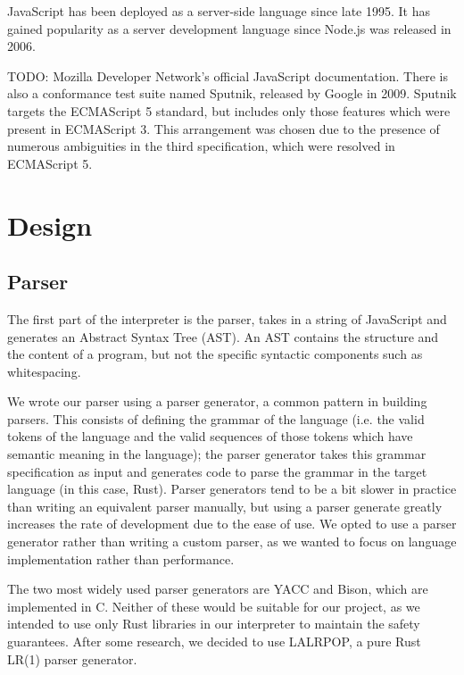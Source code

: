 \documentclass{article}
\begin{document}
\begin{multicols}{2}
JavaScript has been deployed as a server-side language since late 1995. It has
gained popularity as a server development language since Node.js was released in
2006.\newline

TODO: Mozilla Developer Network's official JavaScript documentation\cite{mozdocs}.
There is also a conformance test suite named Sputnik, released by Google in
2009. Sputnik targets the ECMAScript 5 standard, but includes only those
features which were present in ECMAScript 3. This arrangement was chosen due to
the presence of numerous ambiguities in the third specification, which were
resolved in ECMAScript 5.

\section{Design}

\subsection{Parser}

The first part of the interpreter is the parser,
takes in a string of JavaScript and generates an Abstract Syntax Tree (AST).
An AST contains the structure and the content of a program, but not the specific
syntactic components such as whitespacing. \newline

We wrote our parser using a parser generator, a common pattern in building
parsers. This consists of defining the grammar of the language (i.e. the valid
tokens of the language and the valid sequences of those tokens which have
semantic meaning in the language); the parser generator takes this grammar
specification as input and generates code to parse the grammar in the target
language (in this case, Rust). Parser generators tend to be a bit slower in
practice than writing an equivalent parser manually, but using a parser generate
greatly increases the rate of development due to the ease of use. We opted to
use a parser generator rather than writing a custom parser, as we wanted to
focus on language implementation rather than performance. \newline

The two most widely used parser generators are YACC and Bison, which are
implemented in C. Neither of these would be suitable for our project, as we
intended to use only Rust libraries in our interpreter to maintain the safety
guarantees. After some research, we decided to use LALRPOP, a pure Rust LR(1)
parser generator\cite{lalrpop}.


\end{multicols}
\end{document}

